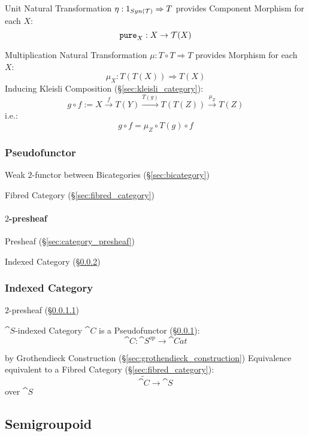 Unit Natural Transformation $\eta : 1_{Syn(\mathcal{T})} \Rightarrow T$
provides Component Morphism for each $X$:
\[
  \mathtt{pure}_X : X \rightarrow \mathcal{T}(X)
\]

Multiplication Natural Transformation $\mu : T \circ T \Rightarrow T$
provides Morphism for each $X$:
\[
  \mu_X : T(T(X)) \Rightarrow T(X)
\]
Inducing Kleisli Composition (\S\ref{sec:kleisli_category}):
\[
  g \circ f := X \xrightarrow{f} T(Y) \xrightarrow{T(g)} T(T(Z))
  \xrightarrow{\mu_Z} T(Z)
\]
i.e.:
\[
  g \circ f = \mu_Z \circ T(g) \circ f
\]



\subsubsection{Pseudofunctor}\label{sec:pseudofunctor}

Weak $2$-functor between Bicategories (\S\ref{sec:bicategory})

Fibred Category (\S\ref{sec:fibred_category})



\paragraph{$2$-presheaf}\label{sec:2_presheaf}\hfill

Presheaf (\S\ref{sec:category_presheaf})

Indexed Category (\S\ref{sec:indexed_category})



\subsubsection{Indexed Category}\label{sec:indexed_category}

$2$-presheaf (\S\ref{sec:2_presheaf})

$\cat{S}$-indexed Category $\cat{C}$ is a Pseudofunctor
(\S\ref{sec:pseudofunctor}):
\[
  \cat{C}: \cat{S}^{op} \rightarrow \cat{Cat}
\]

by Grothendieck Construction (\S\ref{sec:grothendieck_construction})
Equivalence equivalent to a Fibred Category
(\S\ref{sec:fibred_category}):
\[
  \tilde{\cat{C}} \rightarrow \cat{S}
\]
over $\cat{S}$



\subsection{Semigroupoid}\label{sec:semigroupoid}

